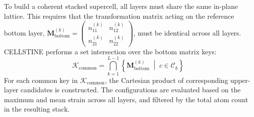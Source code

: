 \documentclass[9pt,a4paper,twoside]{tau-class/tau}
\begin{document}
To build a coherent stacked supercell, all layers must share the same in-plane lattice. This requires that the transformation matrix acting on the reference bottom layer, $\mathbf{M}_{\text{bottom}}^{(k)} = \begin{pmatrix} n_{11}^{(k)} & n_{12}^{(k)} \\ n_{21}^{(k)} & n_{22}^{(k)} \end{pmatrix}$, must be identical across all layers. CELLSTINE performs a set intersection over the bottom matrix keys:
\begin{equation}
    \mathcal{K}_{\text{common}} = \bigcap_{k=1}^{L-1} \left\{ \mathbf{M}_{\text{bottom}}^{(k)} \;\middle|\; c \in \mathcal{C}_k \right\}
\end{equation}
For each common key in $\mathcal{K}_{\text{common}}$, the Cartesian product of corresponding upper-layer candidates is constructed. The configurations are evaluated based on the maximum and mean strain across all layers, and filtered by the total atom count in the resulting stack.
\end{document}
